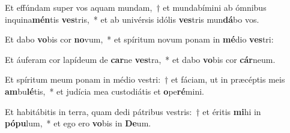 \item Et effúndam super vos aquam mundam,~† et mundabímini ab ómnibus inquina\textbf{mén}tis \textbf{ves}tris,~* et ab univérsis idólis \textbf{ves}tris mun\textbf{dá}bo vos.
\item Et dabo \textbf{vo}bis cor \textbf{no}vum,~* et spíritum novum ponam in \textbf{mé}dio \textbf{ves}tri:
\item Et áuferam cor lapídeum de \textbf{car}ne \textbf{ves}tra,~* et dabo \textbf{vo}bis cor \textbf{cár}neum.
\item Et spíritum meum ponam in médio vestri:~† et fáciam, ut in præcéptis meis \textbf{am}bu\textbf{lé}tis,~* et judícia mea custodiátis et \textbf{o}pe\textbf{ré}mini.
\item Et habitábitis in terra, quam dedi pátribus vestris:~† et éritis \textbf{mi}hi in \textbf{pó}\textbf{pu}lum,~* et ego ero \textbf{vo}bis in \textbf{De}um.
